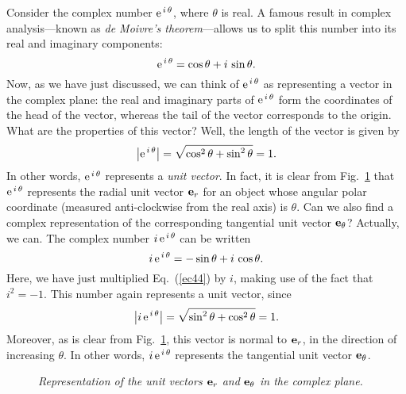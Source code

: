 Consider the complex number ${\rm e}^{\,i\,\theta}$, where $\theta$ is real.
A famous result in complex analysis---known as {\em de Moivre's theorem}---allows us
to split this number into its real and imaginary components:
\begin{equation}
{\rm e}^{\,i\,\theta} = \cos\theta + i\,\sin\theta.\label{ec44}
\end{equation}
Now, as we have just discussed, we can think of  ${\rm e}^{\,i\,\theta}$ as representing a vector
in the complex plane: the real and imaginary parts of ${\rm e}^{\,i\,\theta}$
form the coordinates of the head of the vector, whereas the tail of the vector
corresponds to the origin. What are the properties of this vector? Well,
the length of the vector is given by
\begin{equation}
\left|{\rm e}^{\,i\,\theta}\right| = \sqrt{\cos^2\theta + \sin^2\theta } = 1.
\end{equation}
In other words, ${\rm e}^{\,i\,\theta}$ represents a {\em unit vector}.
In fact, it is clear from Fig.~\ref{f64} that ${\rm e}^{\,i\,\theta}$ represents
the radial unit vector ${\bf e}_r$ for an object whose angular polar
coordinate (measured anti-clockwise from the real axis) is $\theta$. 
Can we also find a complex representation of the corresponding tangential
unit vector ${\bf e}_\theta$? Actually, we can. The
complex number $i\,{\rm e}^{\,i\,\theta}$ can be written
\begin{equation}
i\,{\rm e}^{\,i\,\theta} = -\sin\theta + i\,\cos\theta.
\end{equation}
Here, we have just multiplied Eq.~(\ref{ec44}) by $i$, making use of the fact
that $i^2 = -1$. This number again represents a unit vector, since
\begin{equation}
\left|i\,{\rm e}^{\,i\,\theta}\right| = \sqrt{\sin^2\theta + \cos^2\theta } = 1.
\end{equation}
Moreover, as is clear from Fig.~\ref{f64}, this vector is normal to ${\bf e}_r$, in the
direction of increasing $\theta$. In other words, $i\,{\rm e}^{\,i\,\theta}$ represents
the tangential unit vector ${\bf e}_\theta$. 

\begin{figure}
\epsfysize=2.5in
\centerline{}
\caption{\em Representation of the unit vectors ${\bf e}_r$ and
${\bf e}_\theta$ in  the  complex plane.}\label{f64}  
\end{figure}


